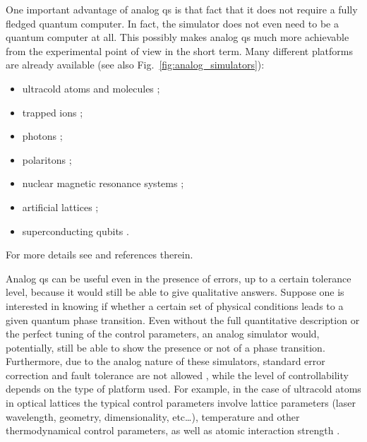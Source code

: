 One important advantage of analog \ac{qs} is that fact that it does not require a fully fledged quantum computer.
In fact, the simulator does not even need to be a quantum computer at all.
This possibly makes analog \ac{qs} much more achievable from the experimental point of view in the short term.
Many different platforms are already available  (see also Fig.~\ref{fig:analog_simulators}):
\begin{itemize}
    \item ultracold atoms and molecules \cite{lewenstein2012ultracold, bloch2012ultracold, bloch2008ultracold};
    \item trapped ions \cite{blatt2012trappedions};
    \item photons \cite{aspuruguzik2012photonic};
    \item polaritons \cite{angelakis2017quantum};
    \item nuclear magnetic resonance systems \cite{somaroo1999simulation};
    \item artificial lattices \cite{singha2011lattice};
    \item superconducting qubits \cite{houck2012superconducting}.
\end{itemize}
For more details see \cite{buluta2009simulators, georgescu2014simulation, hauke2012simulators} and references therein.

Analog \ac{qs} can be useful even in the presence of errors, up to a certain tolerance level, because it would still be able to give qualitative answers.
Suppose one is interested in knowing if whether a certain set of physical conditions leads to a given quantum phase transition.
Even without the full quantitative description or the perfect tuning of the control parameters, an analog simulator would, potentially, still be able to show the presence or not of a phase transition.
Furthermore, due to the analog nature of these simulators, standard error correction and fault tolerance are not allowed \cite{hauke2012simulators}, while the level of controllability depends on the type of platform used.
For example, in the case of ultracold atoms in optical lattices the typical control parameters involve lattice parameters (laser wavelength, geometry, dimensionality, etc\dots), temperature and other thermodynamical control parameters, as well as atomic interaction strength \cite{lewenstein2012ultracold}.



